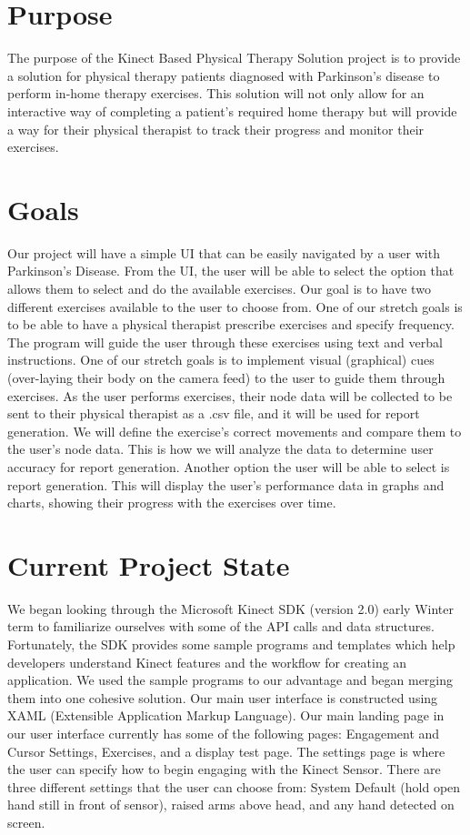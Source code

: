 \documentclass[onecolumn, draftclsnofoot,10pt, compsoc]{IEEEtran}
\begin{document}
\section{Purpose}
The purpose of the Kinect Based Physical Therapy Solution project is to provide a solution for physical therapy patients diagnosed with Parkinson's disease to perform in-home therapy exercises. This solution will not only allow for an interactive way of completing a patient's required home therapy but will provide a way for their physical therapist to track their progress and monitor their exercises.

\section{Goals}
Our project will have a simple UI that can be easily navigated by a user with Parkinson's Disease. From the UI, the user will be able to select the option that allows them to select and do the available exercises. Our goal is to have two different exercises available to the user to choose from. One of our stretch goals is to be able to have a physical therapist prescribe exercises and specify frequency. The program will guide the user through these exercises using text and verbal instructions. One of our stretch goals is to implement visual (graphical) cues (over-laying their body on the camera feed) to the user to guide them through exercises. As the user performs exercises, their node data will be collected to be sent to their physical therapist as a .csv file, and it will be used for report generation. We will define the exercise's correct movements and compare them to the user's node data. This is how we will analyze the data to determine user accuracy for report generation. Another option the user will be able to select is report generation. This will display the user's performance data in graphs and charts, showing their progress with the exercises over time. 

\section{Current Project State}
We began looking through the Microsoft Kinect SDK (version 2.0) early Winter term to familiarize ourselves with some of the API calls and data structures. Fortunately, the SDK provides some sample programs and templates which help developers understand Kinect features and the workflow for creating an application. We used the sample programs to our advantage and began merging them into one cohesive solution. Our main user interface is constructed using XAML (Extensible Application Markup Language). Our main landing page in our user interface currently has some of the following pages: Engagement and Cursor Settings, Exercises, and a display test page. The settings page is where the user can specify how to begin engaging with the Kinect Sensor. There are three different settings that the user can choose from: System Default (hold open hand still in front of sensor), raised arms above head, and any hand detected on screen.
\end{document}
